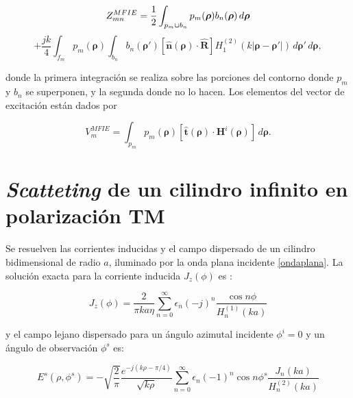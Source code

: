 \documentclass[11pt,a4paper,twoside,pdf]{article}
\numberwithin{equation}{section}
\begin{document}
\begin{equation}
    Z^{MFIE}_{mn}
=
\frac{1}{2}
\int_{p_m \cup b_n}
p_m(\boldsymbol{\rho}) b_n(\boldsymbol{\rho}) \, d\boldsymbol{\rho}
\notag
\end{equation}
\begin{equation}
+
\frac{j k}{4}
\int_{f_m}
p_m(\boldsymbol{\rho})
\int_{b_n}
b_n(\boldsymbol{\rho}')
\left[
\hat{\mathbf{n}}(\boldsymbol{\rho}) \cdot \hat{\mathbf{R}}
\right]
H_1^{(2)}\!\left( k \lvert \boldsymbol{\rho} - \boldsymbol{\rho}' \rvert \right)
\, d\boldsymbol{\rho}'
\, d\boldsymbol{\rho},
\label{ZMFIE}
\end{equation}


donde la primera integración se realiza sobre las porciones del contorno donde $p_m$ y $b_n$ se superponen, y la segunda donde no lo hacen.
Los elementos del vector de excitación están dados por

\begin{equation}
V^{MFIE}_m
=
\int_{p_m}
p_m(\boldsymbol{\rho})
\left[
\hat{\mathbf{t}}(\boldsymbol{\rho}) \cdot \mathbf{H}^i(\boldsymbol{\rho})
\right]
\, d\boldsymbol{\rho}.
\end{equation}




\section{\textit{Scatteting} de un cilindro infinito en polarización TM}



Se resuelven las corrientes inducidas y el campo dispersado de un cilindro bidimensional de radio $a$, iluminado por la onda plana incidente \ref{ondaplana}. La solución exacta para la corriente inducida $J_z(\phi)$ es \cite{ruck1970radar}:

\begin{equation}
J_z(\phi)
=
\frac{2}{\pi k a \eta}
\sum_{n=0}^{\infty}
\epsilon_n (-j)^n
\frac{\cos n\phi}{H_n^{(1)}(k a)}
\label{Jexacta}
\end{equation}

y el campo lejano dispersado para un ángulo azimutal incidente $\phi^i = 0$ y un ángulo de observación $\phi^s$ es:

\begin{equation}
E^s(\rho, \phi^s)
=
-
\sqrt{\frac{2}{\pi}}
\frac{e^{-j (k \rho - \pi/4)}}{\sqrt{k \rho}}
\sum_{n=0}^{\infty}
\epsilon_n (-1)^n
\cos n\phi^s
\frac{J_n(k a)}{H_n^{(2)}(k a)}
\label{Eexacto}
\end{equation}
\end{document}
